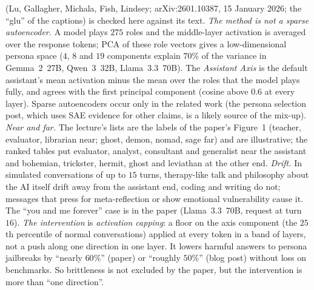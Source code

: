 \begin{beyond}\label{box:L7-axis}
\citet{lu2026assistant} (Lu, Gallagher, Michala, Fish, Lindsey; arXiv:2601.10387, 15 January 2026; the ``glu'' of the captions) is checked here against its text. \emph{The method is not a sparse autoencoder.} A model plays $275$ roles and the middle-layer activation is averaged over the response tokens; PCA of these role vectors gives a low-dimensional persona space ($4$, $8$ and $19$ components explain $70\%$ of the variance in Gemma~2~27B, Qwen~3~32B, Llama~3.3~70B). The \emph{Assistant Axis} is the default assistant's mean activation minus the mean over the roles that the model plays fully, and agrees with the first principal component (cosine above $0.6$ at every layer). Sparse autoencoders occur only in the related work (the persona selection post, which uses SAE evidence for other claims, is a likely source of the mix-up).
\emph{Near and far.} The lecture's lists are the labels of the paper's Figure~1 (teacher, evaluator, librarian near; ghost, demon, nomad, sage far) and are illustrative; the ranked tables put evaluator, analyst, consultant and generalist near the assistant and bohemian, trickster, hermit, ghost and leviathan at the other end.
\emph{Drift.} In simulated conversations of up to $15$ turns, therapy-like talk and philosophy about the AI itself drift away from the assistant end, coding and writing do not; messages that press for meta-reflection or show emotional vulnerability cause it. The ``you and me forever'' case is in the paper (Llama~3.3~70B, request at turn $16$).
\emph{The intervention} is \emph{activation capping}: a floor on the axis component (the $25$th percentile of normal conversations) applied at every token in a band of layers, not a push along one direction in one layer. It lowers harmful answers to persona jailbreaks by ``nearly $60\%$'' (paper) or ``roughly $50\%$'' (blog post) without loss on benchmarks. So brittleness is not excluded by the paper, but the intervention is more than ``one direction''.
\end{beyond}

